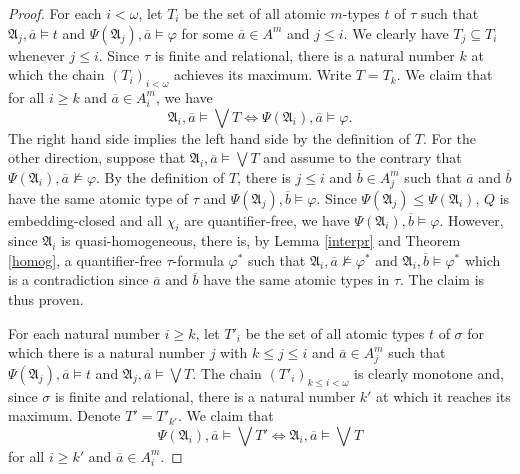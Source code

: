 \documentclass{ndjflart}
\theoremstyle{plain}
\theoremstyle{definition}
\numberwithin{equation}{section}
\begin{document}
\begin{proof}
For each $i < \omega$, let $T_i$ be the set of all atomic
$m$-types $t$ of $\tau$
such that $\mathfrak{A}_j, \overline{a} \vDash t$
and $\Psi(\mathfrak{A}_j), \overline{a} \vDash \varphi$
for some $\overline{a} \in A^m$ and $j \leq i$.
We clearly have $T_j \subseteq T_i$ whenever $j \leq i$.
Since $\tau$ is finite and relational, there is a natural number $k$
at which the chain $(T_i)_{i < \omega}$ achieves its maximum.
Write $T = T_k$.
We claim that for all $i \geq k$ and $\overline{a} \in A_i^m$, we have
\begin{equation}\label{eq_0}
\mathfrak{A}_i, \overline{a} \vDash \bigvee T
\Leftrightarrow
\Psi(\mathfrak{A}_i), \overline{a} \vDash \varphi.
\end{equation}
The right hand side implies the left hand side by the
definition of $T$.
For the other direction, suppose that
$\mathfrak{A}_i, \overline{a} \vDash \bigvee T$
and assume to the contrary that
$\Psi(\mathfrak{A}_i), \overline{a} \nvDash \varphi$.
By the definition of $T$, there is $j \leq i$ and $\overline{b} \in A_j^m$
such that $\overline{a}$ and $\overline{b}$ have the same atomic type of $\tau$
and $\Psi(\mathfrak{A}_j), \overline{b} \vDash \varphi$.
Since $\Psi(\mathfrak{A}_j) \leq \Psi(\mathfrak{A}_i)$, $Q$ is embedding-closed
and all $\chi_i$ are quantifier-free, we have
$\Psi(\mathfrak{A}_i), \overline{b} \vDash \varphi$.
However, since $\mathfrak{A}_i$ is quasi-homogeneous,
there is, by Lemma \ref{interpr} and Theorem \ref{homog},
a quantifier-free $\tau$-formula
$\varphi^*$ such that
$\mathfrak{A}_i, \overline{a} \nvDash \varphi^*$
and $\mathfrak{A}_i, \overline{b} \vDash \varphi^*$
which is a contradiction since $\overline{a}$ and $\overline{b}$ have the
same atomic types in $\tau$.
The claim is thus proven.

For each natural number $i \geq k$,
let $T'_i$ be the set of all atomic types $t$ of $\sigma$
for which there is a natural number $j$ with
$k \leq j \leq i$ and $\overline{a} \in A^m_j$ such that
$\Psi(\mathfrak{A}_j), \overline{a} \vDash t$ and
$\mathfrak{A}_j, \overline{a} \vDash \bigvee T$.
The chain $(T'_i)_{k \leq i < \omega}$ is clearly monotone and,
since $\sigma$ is finite and relational,
there is a natural number $k'$ at which it reaches its maximum.
Denote $T' = T'_{k'}$.
We claim that
\begin{equation}\label{eq_1}
\Psi(\mathfrak{A}_i), \overline{a} \vDash \bigvee T' \Leftrightarrow
\mathfrak{A}_i, \overline{a} \vDash \bigvee T
\end{equation}
for all $i \geq k'$ and $\overline{a} \in A_i^m$.


\end{proof}
\end{document}
